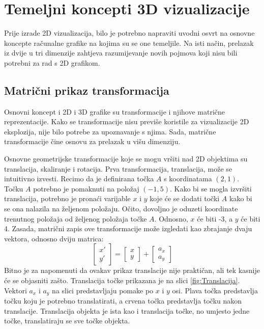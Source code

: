 \documentclass{foi}
\begin{document}
\chapter{Temeljni koncepti 3D vizualizacije}
Prije izrade 2D vizualizacija, bilo je potrebno napraviti uvodni osvrt na osnovne koncepte računalne grafike na kojima su se one temeljile. Na isti način, prelazak iz dvije u tri dimenzije zahtjeva razumijevanje novih pojmova koji nisu bili potrebni za rad s 2D grafikom.  

\section{Matrični prikaz transformacija}
Osnovni koncept i 2D i 3D grafike su transformacije i njihove matrične reprezentacije. Kako se transformacije nisu previše koristile za vizualizacije 2D eksplozija, nije bilo potrebe za upoznavanje s njima. Sada, matrične transformacije čine osnovu za prelazak u višu dimenziju.

Osnovne geometrijske transformacije koje se mogu vršiti nad 2D objektima su translacija, skaliranje i rotacija. Prva transformacija, translacija, može se intuitivno izvesti. Recimo da je definirana točka $A$ s koordinatama $(2, 1)$. Točku $A$ potrebno je pomaknuti na položaj $(-1, 5)$. Kako bi se mogla izvršiti translacija, potrebno je pronaći varijable $x$ i $y$ koje će se dodati točki $A$ kako bi se ona nalazila na željenom položaju. Očito, dovoljno je oduzeti koordinate trenutnog položaja od željenog položaja točke $A$. Odnosno, $x$ će biti -3, a $y$ će biti 4. Zasada, matrični zapis ove transformacije može izgledati kao zbrajanje dvaju vektora, odnosno dviju matrica:
\[
\begin{bmatrix}
x'\\
y' 
\end{bmatrix}
=
\begin{bmatrix}
x\\
y
\end{bmatrix}
+
\begin{bmatrix}
a_x\\
a_y
\end{bmatrix}
\]
Bitno je za napomenuti da ovakav prikaz translacije nije praktičan, ali tek kasnije će se objasniti zašto. Translacija točke prikazana je na slici \ref{fig:Translacija}. Vektori $a_x$ i $a_y$ na slici predstavljaju pomake po $x$ i $y$ osi. Plava točka predstavlja točku koju je potrebno translatirati, a crvena točka predstavlja točku nakon translacije. Translacija objekta je ista kao i translacija točke, no umjesto jedne točke, translatiraju se sve točke objekta. 
\end{document}
